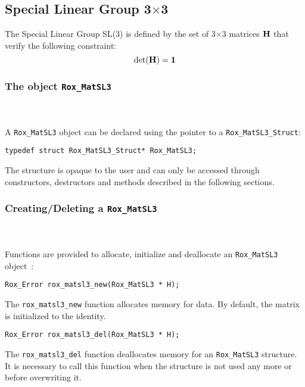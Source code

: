 \subsection{Special Linear Group 3$\times$3}
\label{sec:matsl3}
The Special Linear Group SL(3) is defined by the set of 3$\times$3 matrices $\bf{H}$ that verify the following constraint:
\[
\det(\bf{H}) = 1
\] 

\subsubsection{The object {\tt Rox\_MatSL3}}
\label{sss:matsl3_object}
~\\~\\
A \lstinline$Rox_MatSL3$ object can be declared using the pointer to a \lstinline$Rox_MatSL3_Struct$: 

\begin{lstlisting}
typedef struct Rox_MatSL3_Struct* Rox_MatSL3;
\end{lstlisting}

The structure is opaque to the user and can only be accessed through constructors, destructors and methods described in the following sections.

\subsubsection{Creating/Deleting a {\tt Rox\_MatSL3}}
\label{sss:matsl3_delnew}
~\\~\\
Functions are provided to allocate, initialize and deallocate an \lstinline$Rox_MatSL3$ object~:
\begin{lstlisting}
Rox_Error rox_matsl3_new(Rox_MatSL3 * H);
\end{lstlisting}
The \lstinline$rox_matsl3_new$ function allocates memory for data. By default, the matrix is initialized to the identity.\\ 


\begin{lstlisting}
Rox_Error rox_matsl3_del(Rox_MatSL3 * H);
\end{lstlisting}
The \lstinline$rox_matsl3_del$ function deallocates memory for an \lstinline$Rox_MatSL3$ structure. It is necessary to call this function when the
structure is not used any more or before overwriting it.

